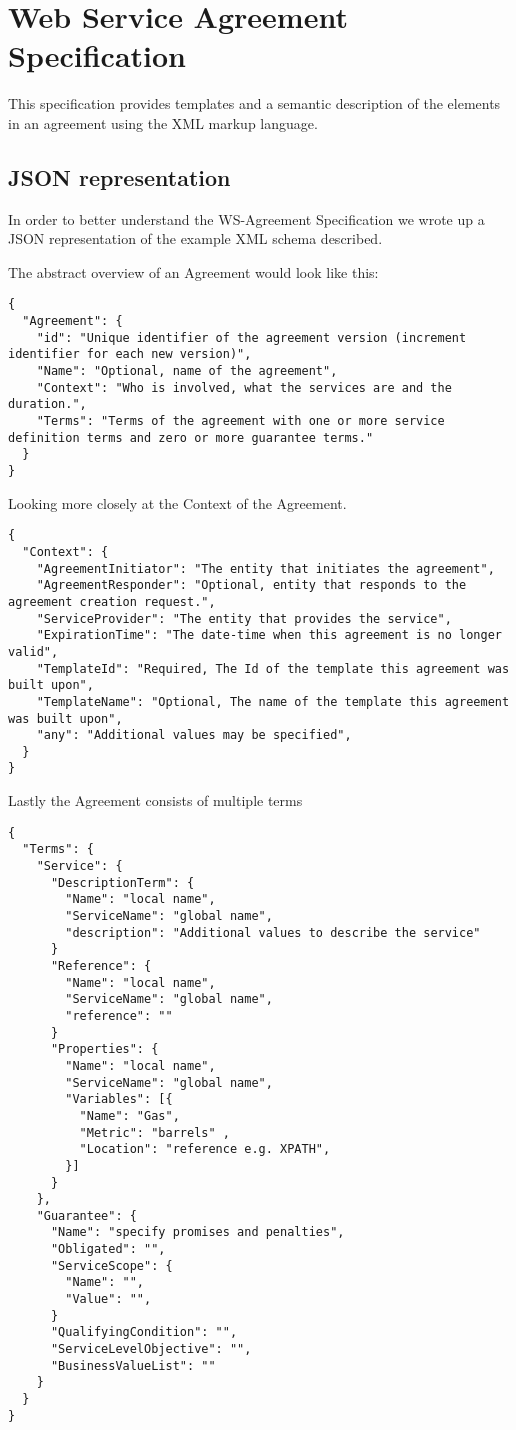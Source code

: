 \section{Web Service Agreement Specification}
This specification provides templates and a semantic description of the elements in an agreement using the XML markup language. 

\subsection{JSON representation}
In order to better understand the WS-Agreement Specification we wrote up a JSON representation of the example XML schema described.

The abstract overview of an Agreement would look like this:
\begin{verbatim}
{
  "Agreement": {
    "id": "Unique identifier of the agreement version (increment identifier for each new version)",
    "Name": "Optional, name of the agreement",
    "Context": "Who is involved, what the services are and the duration.",
    "Terms": "Terms of the agreement with one or more service definition terms and zero or more guarantee terms."
  }
}
\end{verbatim}

Looking more closely at the Context of the Agreement.
\begin{verbatim}
{
  "Context": {
    "AgreementInitiator": "The entity that initiates the agreement",
    "AgreementResponder": "Optional, entity that responds to the agreement creation request.",
    "ServiceProvider": "The entity that provides the service",
    "ExpirationTime": "The date-time when this agreement is no longer valid",
    "TemplateId": "Required, The Id of the template this agreement was built upon",
    "TemplateName": "Optional, The name of the template this agreement was built upon",
    "any": "Additional values may be specified",
  }
}
\end{verbatim}

Lastly the Agreement consists of multiple terms
\begin{verbatim}
{
  "Terms": {
    "Service": {
      "DescriptionTerm": {
        "Name": "local name",
        "ServiceName": "global name",
        "description": "Additional values to describe the service"
      }
      "Reference": {
        "Name": "local name",
        "ServiceName": "global name",
        "reference": ""
      }
      "Properties": {
        "Name": "local name",
        "ServiceName": "global name",
        "Variables": [{
          "Name": "Gas",
          "Metric": "barrels" ,
          "Location": "reference e.g. XPATH",
        }]
      }
    },
    "Guarantee": {
      "Name": "specify promises and penalties",
      "Obligated": "",
      "ServiceScope": {
        "Name": "",
        "Value": "",
      }
      "QualifyingCondition": "",
      "ServiceLevelObjective": "",
      "BusinessValueList": ""
    }
  }
}
\end{verbatim}
